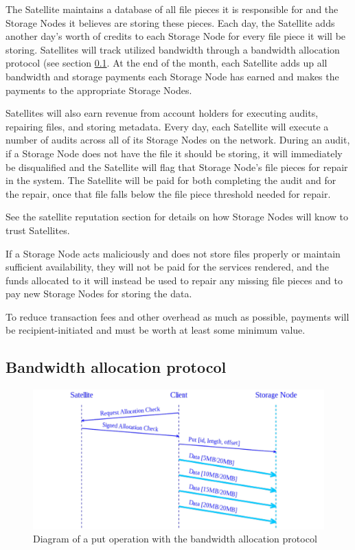 \documentclass[8pt,fleqn,openany]{book}
\begin{document}
The Satellite maintains a database of all file pieces it is responsible for
and the Storage Nodes it believes are storing these pieces. Each day,
the Satellite adds another day's worth
of credits to each Storage Node for every file
piece
it will be storing.
Satellites will track utilized bandwidth through a bandwidth allocation
protocol (see section \ref{bap}.
At the end of the month, each Satellite
adds up all bandwidth and storage payments each Storage Node has earned and
makes
the payments to the appropriate Storage Nodes.

Satellites will also earn revenue from account holders for executing audits,
repairing files, and storing metadata. Every day, each Satellite will execute
a number of audits across all of its Storage Nodes on the network. During an
audit,
if a Storage Node does not have the file it should be storing, it will
immediately be disqualified and
the Satellite will flag that Storage Node's file pieces for
repair
in the system.
The Satellite will be paid for both completing the audit
and for the repair,
once that file falls below the file piece threshold needed for
repair.

See the satellite reputation section for details on
how Storage Nodes will know to trust Satellites.

If a Storage Node acts
maliciously and does not store files properly or maintain sufficient
availability, they will not be paid for the services rendered, and the funds
allocated to it will instead be used to repair any missing
file pieces and to pay new Storage Nodes for storing the data.

To reduce transaction fees and other overhead as much as possible, payments
will be recipient-initiated and must be worth at least some minimum value.

\subsection{Bandwidth allocation protocol}\label{bap}

\begin{figure}
\centering
\includegraphics[width=\textwidth]{diagram-drafts/bandwidth-allocation/bandwidth-put.pdf}
\caption{Diagram of a put operation with the bandwidth allocation protocol}
\label{fig:bap-put}
\end{figure}
\end{document}
